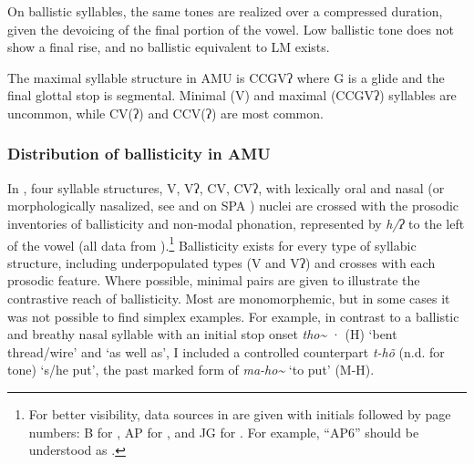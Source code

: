 \documentclass[output=paper]{langscibook}
\begin{document}
On ballistic syllables, the same tones are realized over a compressed duration, given the devoicing of the final portion of the vowel. Low ballistic tone does not show a final rise, and no ballistic equivalent to LM exists.

The maximal syllable structure in AMU is CCGVʔ where G is a glide and the final glottal stop is segmental. Minimal (V) and maximal (CCGVʔ) syllables are uncommon, while CV(ʔ) and CCV(ʔ) are most common. 

\subsubsection{Distribution of ballisticity in AMU}

In , four syllable structures, V, Vʔ, CV, CVʔ, with lexically oral and nasal (or morphologically nasalized, see \citealt{Dobui2021} and on SPA  \citealt{CortézVázquez2016}) nuclei are crossed with the prosodic inventories of ballisticity and non-modal phonation, represented by \textit{h/ʔ} to the left of the vowel (all data from \citealt{Bauernschmidt2010}).\footnote{For better visibility, data sources in  are given with initials followed by page numbers: B for \citet{Bauernschmidt2010}, AP for  \citet{ApóstolPolanco2014}, and JG for  \citet{deJesúsGarcía2004}. For example, “AP6” should be understood as  \citet[6]{ApóstolPolanco2014}.} Ballisticity exists for every type of syllabic structure, including underpopulated types (V and Vʔ) and crosses with each prosodic feature. Where possible, minimal pairs are given to illustrate the contrastive reach of ballisticity. Most are monomorphemic, but in some cases it was not possible to find simplex examples. For example, in contrast to a ballistic and breathy nasal syllable with an initial stop onset \textit{tho\~{} }· (H) ‘bent thread/wire’ and ‘as well as’, I included a controlled counterpart \textit{t-hõ} (n.d. for tone) ‘s/he put’, the past marked form of \textit{ma-ho\~{} } ‘to put’ (M-H).



\end{document}
